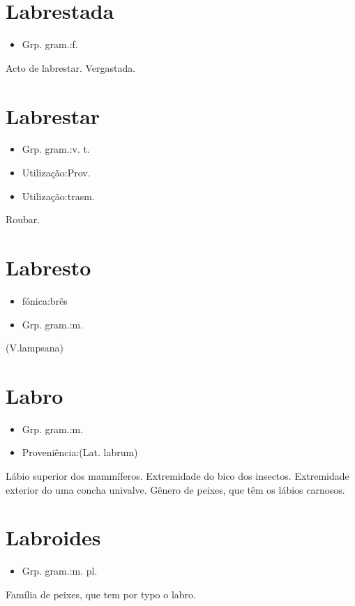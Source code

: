 \section{Labrestada}
\begin{itemize}
\item {Grp. gram.:f.}
\end{itemize}
Acto de labrestar.
Vergastada.
\section{Labrestar}
\begin{itemize}
\item {Grp. gram.:v. t.}
\end{itemize}
\begin{itemize}
\item {Utilização:Prov.}
\end{itemize}
\begin{itemize}
\item {Utilização:trasm.}
\end{itemize}
Roubar.
\section{Labresto}
\begin{itemize}
\item {fónica:brês}
\end{itemize}
\begin{itemize}
\item {Grp. gram.:m.}
\end{itemize}
(V.lampsana)
\section{Labro}
\begin{itemize}
\item {Grp. gram.:m.}
\end{itemize}
\begin{itemize}
\item {Proveniência:(Lat. \textunderscore labrum\textunderscore )}
\end{itemize}
Lábio superior dos mammíferos.
Extremidade do bico dos insectos.
Extremidade exterior do uma concha univalve.
Gênero de peixes, que têm os lábios carnosos.
\section{Labroides}
\begin{itemize}
\item {Grp. gram.:m. pl.}
\end{itemize}
Família de peixes, que tem por typo o labro.
